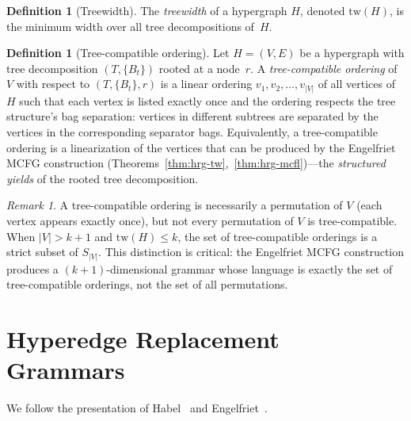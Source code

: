 \documentclass[11pt,a4paper]{article}
\theoremstyle{plain}
\theoremstyle{definition}
\newtheorem{definition}[theorem]{Definition}
\theoremstyle{remark}
\newtheorem{remark}[theorem]{Remark}
\begin{document}
\begin{definition}[Treewidth]\label{def:treewidth}
The \emph{treewidth} of a hypergraph $H$, denoted $\mathrm{tw}(H)$, is the minimum width over all tree decompositions of~$H$.
\end{definition}

\begin{definition}[Tree-compatible ordering]\label{def:tree-compatible-ordering}
Let $H = (V, E)$ be a hypergraph with tree decomposition $(T, \{B_t\})$ rooted at a node~$r$.
A \emph{tree-compatible ordering} of $V$ with respect to $(T, \{B_t\}, r)$ is a linear ordering $v_1, v_2, \ldots, v_{|V|}$ of all vertices of $H$ such that each vertex is listed exactly once and the ordering respects the tree structure's bag separation: vertices in different subtrees are separated by the vertices in the corresponding separator bags.
Equivalently, a tree-compatible ordering is a linearization of the vertices that can be produced by the Engelfriet MCFG construction (Theorems~\ref{thm:hrg-tw},~\ref{thm:hrg-mcfl})---the \emph{structured yields} of the rooted tree decomposition.
\end{definition}

\begin{remark}\label{rem:tree-compat-vs-all-perms}
A tree-compatible ordering is necessarily a permutation of $V$ (each vertex appears exactly once), but not every permutation of $V$ is tree-compatible.
When $|V| > k + 1$ and $\mathrm{tw}(H) \leq k$, the set of tree-compatible orderings is a strict subset of $S_{|V|}$.
This distinction is critical: the Engelfriet MCFG construction produces a $(k{+}1)$-dimensional grammar whose language is exactly the set of tree-compatible orderings, not the set of all permutations.
\end{remark}

\section{Hyperedge Replacement Grammars}\label{sec:hrg}

We follow the presentation of Habel~\cite{Habel92} and Engelfriet~\cite{Engelfriet97}.
\end{document}
